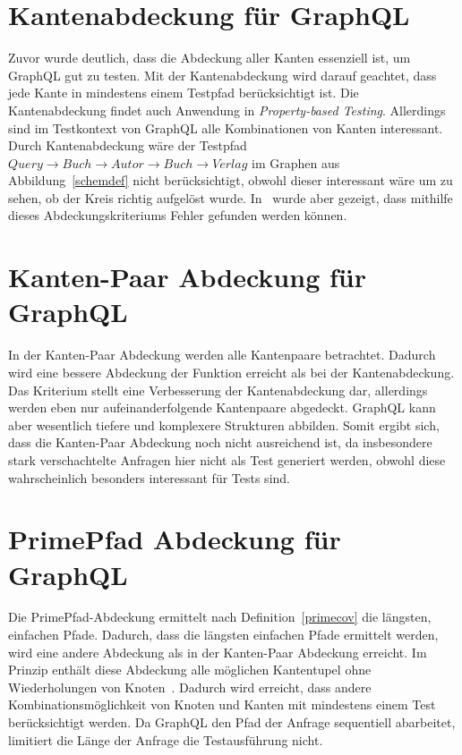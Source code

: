 \section{Kantenabdeckung für GraphQL}

Zuvor wurde deutlich, dass die Abdeckung aller Kanten essenziell ist, um GraphQL gut zu testen.
Mit der Kantenabdeckung wird darauf geachtet, dass jede Kante in mindestens einem Testpfad berücksichtigt ist.
Die Kantenabdeckung findet auch Anwendung in \textit{Property-based Testing}\cite[vgl. D-RQ1 ]{property-based-testing}.
Allerdings sind im Testkontext von GraphQL alle Kombinationen von Kanten interessant.
Durch Kantenabdeckung wäre der Testpfad $Query \rightarrow Buch \rightarrow Autor \rightarrow Buch \rightarrow Verlag$
im Graphen aus Abbildung~\ref{schemdef} nicht berücksichtigt, obwohl dieser interessant wäre um zu sehen, ob der Kreis richtig aufgelöst wurde.
In~\cite{property-based-testing} wurde aber gezeigt, dass mithilfe dieses Abdeckungskriteriums Fehler gefunden werden können.

\section{Kanten-Paar Abdeckung für GraphQL}

In der Kanten-Paar Abdeckung werden alle Kantenpaare betrachtet.
Dadurch wird eine bessere Abdeckung der Funktion erreicht als bei der Kantenabdeckung.
Das Kriterium stellt eine Verbesserung der Kantenabdeckung dar, allerdings werden eben nur aufeinanderfolgende Kantenpaare abgedeckt.
GraphQL kann aber wesentlich tiefere und komplexere Strukturen abbilden.
Somit ergibt sich, dass die Kanten-Paar Abdeckung noch nicht ausreichend ist, da insbesondere stark verschachtelte Anfragen hier nicht als Test generiert werden,
obwohl diese wahrscheinlich besonders interessant für Tests sind.

\section{PrimePfad Abdeckung für GraphQL}

Die PrimePfad-Abdeckung ermittelt nach Definition~\ref{primecov} die längsten, einfachen Pfade.
Dadurch, dass die längsten einfachen Pfade ermittelt werden, wird eine andere Abdeckung als in der Kanten-Paar Abdeckung erreicht.
Im Prinzip enthält diese Abdeckung alle möglichen Kantentupel ohne Wiederholungen von Knoten~\cite[vgl. S. 42]{software-testing}.
Dadurch wird erreicht, dass andere Kombinationsmöglichkeit von Knoten und Kanten mit mindestens einem Test berücksichtigt werden.
Da GraphQL den Pfad der Anfrage sequentiell abarbeitet, limitiert die Länge der Anfrage die Testausführung nicht.

